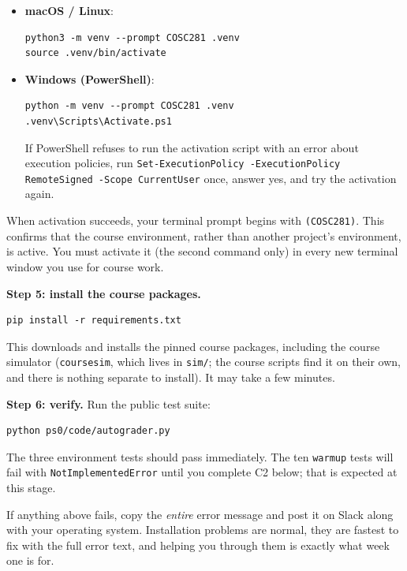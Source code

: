 \documentclass[11pt]{article}
\providecommand{\tightlist}{\setlength{\itemsep}{0pt}\setlength{\parskip}{0pt}}
\begin{document}
\begin{itemize}\tightlist
\item \textbf{macOS / Linux}:
\begin{lstlisting}[language={}]
python3 -m venv --prompt COSC281 .venv
source .venv/bin/activate
\end{lstlisting}
\item \textbf{Windows (PowerShell)}:
\begin{lstlisting}[language={}]
python -m venv --prompt COSC281 .venv
.venv\Scripts\Activate.ps1
\end{lstlisting}
      If PowerShell refuses to run the activation script with an error
      about execution policies, run
      \texttt{Set-ExecutionPolicy -ExecutionPolicy RemoteSigned -Scope
      CurrentUser} once, answer yes, and try the activation again.
\end{itemize}

When activation succeeds, your terminal prompt begins with
\texttt{(COSC281)}. This confirms that the course environment, rather than
another project's environment, is active. You must activate it (the second
command only) in every new terminal window you use for course work.

\textbf{Step 5: install the course packages.}

\begin{lstlisting}[language={}]
pip install -r requirements.txt
\end{lstlisting}

This downloads and installs the pinned course packages, including the
course simulator (\texttt{coursesim}, which lives in \texttt{sim/}; the
course scripts find it on their own, and there is nothing separate to
install). It may take a few minutes.

\textbf{Step 6: verify.} Run the public test suite:

\begin{lstlisting}[language={}]
python ps0/code/autograder.py
\end{lstlisting}

The three environment tests should pass immediately. The ten
\texttt{warmup} tests will fail with \texttt{NotImplementedError} until
you complete C2 below; that is expected at this stage.

If anything above fails, copy the \emph{entire} error message and post it
on Slack along with your operating system. Installation problems are
normal, they are fastest to fix with the full error text, and helping you
through them is exactly what week one is for.
\end{document}
